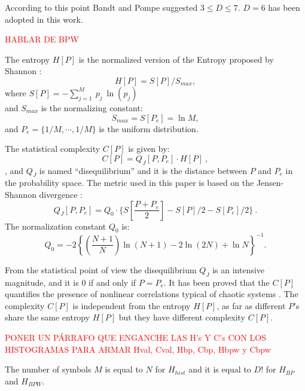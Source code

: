 According to this point Bandt and Pompe suggested $3\leq D \leq 7$. $D=6$ has been adopted in this work.

\textcolor{red}{HABLAR DE BPW}

The entropy $H[P]$ is the normalized version of the Entropy proposed by Shannon \cite{Shannon1949a}:
\begin{equation}\label{eq:sha}
H[P] = S[P] /S_{max},
\end{equation}
where $S[P]=-\sum _{j=1}^{M}~p_j~\ln( p_j )$\\ and $S_{max}$ is
the normalizing constant:
\begin{equation}
\label{eq:Smax} S_{max}= S[P_e] = \ln M,
\end{equation}
and $P_e=\{ 1/M, \cdots,1/M\}$ is the uniform distribution.

The statistical complexity $C[P]$ is given by:
\begin{equation}
\label{eq:inten}
C[{P}]=Q_{J}[{P,P_e}]\cdot H[{P}] \ ,
\end{equation}
, and
$Q_{J}$ is named ``disequilibrium'' and it is the distance between $P$ and $P_e$ in the probability space.
The metric used in this paper is based on the Jensen-Shannon divergence \cite{Lamberti2004}:
\begin{equation}
\label{eq:disequi}
Q_{J}[{P,P_e}]= Q_0 \cdot \{S[\frac{P+P_e}{2}]-S[P]/2-S[P_e]/2 \} \ .
\end{equation}
The normalization constant $Q_0$ is:
\begin{equation}
\label{eq:q0j}
Q_0=-2 \left\{ \left( \frac{N+1}{N} \right) \ln(N+1) - 2 \ln(2N) + \ln N \right\}^{-1} .
\end{equation}

From the statistical point of view the disequilibrium $Q_J$ is an intensive magnitude, and it is $0$ if and only if $P=P_e$.
It has been proved that the $C[P]$ quantifies the presence of nonlinear correlations typical of chaotic systems \cite{Martin2003,Lamberti2004}.
The complexity $C[P]$ is independent from the entropy $H[P]$, as far as different $P$'s share the same entropy $H[P]$ but they have different complexity $C[P]$.

\textcolor{red}{PONER UN PÁRRAFO QUE ENGANCHE LAS H's Y C's CON LOS HISTOGRAMAS PARA ARMAR Hval, Cval, Hbp, Cbp, Hbpw y Cbpw}

The number of symbols $M$ is equal to $N$ for $H_{hist}$ and it is equal to $D!$ for $H_{BP}$ and $H_{BPW}$.

